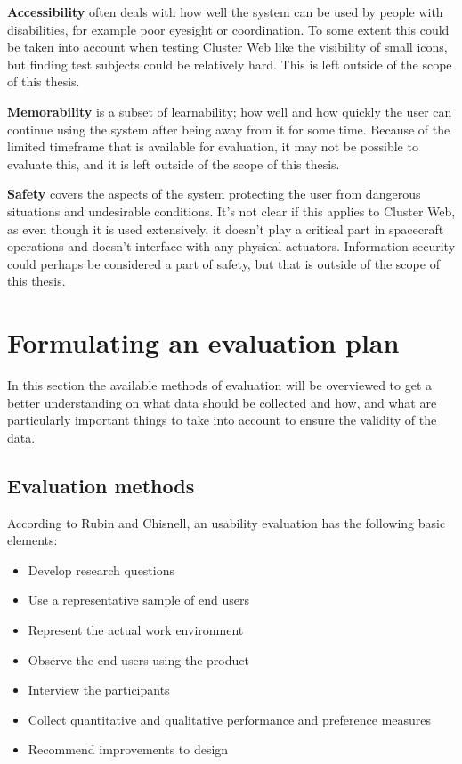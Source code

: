 \textbf{Accessibility} often deals with how well the system can be used by people with disabilities, for example poor eyesight or coordination. To some extent this could be taken into account when testing Cluster Web like the visibility of small icons, but finding test subjects could be relatively hard. This is left outside of the scope of this thesis.

\textbf{Memorability} is  a subset of learnability; how well and how quickly the user can continue using the system after being away from it for some time. Because of the limited timeframe that is available for evaluation, it may not be possible to evaluate this, and it is left outside of the scope of this thesis.

\textbf{Safety} covers the aspects of the system protecting the user from dangerous situations and undesirable conditions. It's not clear if this applies to Cluster Web, as even though it is used extensively, it doesn't play a critical part in spacecraft operations and doesn't interface with any physical actuators. Information security could perhaps be considered a part of safety, but that is outside of the scope of this thesis.

\cite{bevanevaluation, rubin2008handbook, albert2013measuring, laugwitz2008construction, hornbaek2006current}

\section{Formulating an evaluation plan}
In this section the available methods of evaluation will be overviewed to get a better understanding on what data should be collected and how, and what are particularly important things to take into account to ensure the validity of the data.

\subsection{Evaluation methods}
According to Rubin and Chisnell, an usability evaluation has the following basic elements:
\begin{itemize}
\item Develop research questions
\item Use a representative sample of end users
\item Represent the actual work environment
\item Observe the end users using the product
\item Interview the participants
\item Collect quantitative and qualitative performance and preference measures
\item Recommend improvements to design
\end{itemize}


